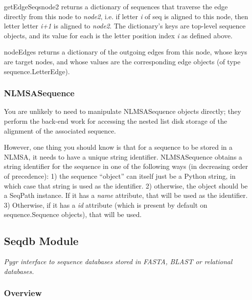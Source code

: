 \documentclass{howto}
\begin{document}
\begin{funcdesc}{getEdgeSeqs}{node2}
  returns a dictionary of sequences
  that traverse the edge directly from this node to {\em node2},
  i.e. if letter {\em i} of seq is aligned to this node, then
  letter letter {\em i+1} is aligned to {\em node2}.  The
  dictionary's keys are top-level sequence objects, and its
  value for each is the letter position index {\em i} as defined above.
\end{funcdesc}

\begin{funcdesc}{nodeEdges}{}
  returns a dictionary of the outgoing edges
  from this node, whose keys are target nodes, and whose values
  are the corresponding edge objects (of type sequence.LetterEdge).
\end{funcdesc}


\subsubsection{NLMSASequence}
You are unlikely to need to manipulate NLMSASequence objects directly;
they perform the back-end work for accessing the nested list disk storage
of the alignment of the associated sequence.

However, one thing you should know is that for a sequence to be stored
in a NLMSA, it needs to have a unique string identifier.
NLMSASequence obtains a string identifier for the sequence in one of the following
ways (in decreasing order of precedence): 1) the sequence ``object'' can itself just
be a Python string, in which case that string is used as the identifier. 2) otherwise,
the object should be a SeqPath instance.  If it has a {\em name} attribute, that will
be used as the identifier. 3) Otherwise, if it has a {\em id} attribute (which is present
by default on sequence.Sequence objects), that will be used.




\subsection{Seqdb Module}
\label{seqdb}

{\em Pygr interface to sequence databases stored in FASTA, BLAST or relational databases.}


\subsubsection{Overview}
\end{document}
